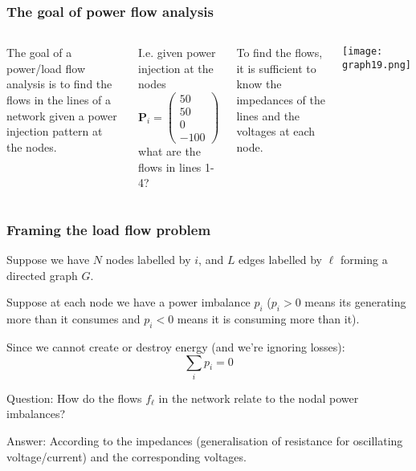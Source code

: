 \documentclass[10pt,aspectratio=169,dvipsnames]{beamer}
\begin{document}
\begin{frame}
  \frametitle{The goal of power flow analysis}

  \begin{columns}

  The goal of a power/load flow analysis is to find the flows in the
  lines of a network given a power injection pattern at the nodes.


    I.e. given power injection at the nodes
\begin{equation*}
\mathbf{P}_{i}=\left(\begin{matrix}
50 \\
50 \\
0 \\
-100
\end{matrix}\right)
\end{equation*}
what are the flows in lines 1-4?

\vspace{.1cm}

To find the flows, it is sufficient to know the \alert{impedances} of
the lines and the \alert{voltages} at each node.

\texttt{[image: graph19.png]}
\end{columns}


\end{frame}



\begin{frame}
  \frametitle{Framing the load flow problem}

  Suppose we have $N$ nodes labelled by $i$, and $L$ edges labelled by
  $\ell$ forming a directed graph $G$.

  Suppose at each node we have a \alert{power imbalance} $p_i$ ($p_i >
  0$ means its generating more than it consumes and $p_i < 0$ means it
  is consuming more than it).

  Since we cannot create or destroy energy (and we're ignoring losses):
  \begin{equation*}
    \sum_i p_i = 0
  \end{equation*}

  \alert{Question}: How do the flows $f_\ell$ in the network relate to the nodal power
  imbalances?

  \alert{Answer}: According to the impedances (generalisation of
  resistance for oscillating voltage/current) and the corresponding
  voltages.

\end{frame}
\end{document}
